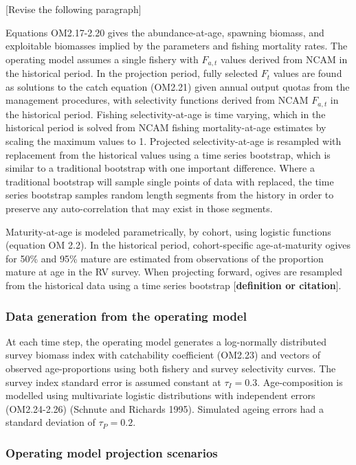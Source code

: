 \documentclass[12pt,]{article}
\begin{document}
{[}Revise the following paragraph{]}

Equations OM2.17-2.20 gives the abundance-at-age, spawning biomass, and
exploitable biomasses implied by the parameters and fishing mortality
rates. The operating model assumes a single fishery with \(F_{a,t}\)
values derived from NCAM in the historical period. In the projection
period, fully selected \(F_t\) values are found as solutions to the
catch equation (OM2.21) given annual output quotas from the management
procedures, with selectivity functions derived from NCAM \(F_{a,t}\) in
the historical period. Fishing selectivity-at-age is time varying, which
in the historical period is solved from NCAM fishing mortality-at-age
estimates by scaling the maximum values to 1. Projected
selectivity-at-age is resampled with replacement from the historical
values using a time series bootstrap, which is similar to a traditional
bootstrap with one important difference. Where a traditional bootstrap
will sample single points of data with replaced, the time series
bootstrap samples random length segments from the history in order to
preserve any auto-correlation that may exist in those segments.

Maturity-at-age is modeled parametrically, by cohort, using logistic
functions (equation OM 2.2). In the historical period, cohort-specific
age-at-maturity ogives for 50\% and 95\% mature are estimated from
observations of the proportion mature at age in the RV survey. When
projecting forward, ogives are resampled from the historical data using
a time series bootstrap {[}\textbf{definition or citation}{]}.

\subsubsection{Data generation from the operating
model}\label{data-generation-from-the-operating-model}

At each time step, the operating model generates a log-normally
distributed survey biomass index with catchability coefficient (OM2.23)
and vectors of observed age-proportions using both fishery and survey
selectivity curves. The survey index standard error is assumed constant
at \(\tau_I = 0.3\). Age-composition is modelled using multivariate
logistic distributions with independent errors (OM2.24-2.26) (Schnute
and Richards 1995). Simulated ageing errors had a standard deviation of
\(\tau_P=0.2\).

\subsubsection{Operating model projection
scenarios}\label{operating-model-projection-scenarios}
\end{document}
